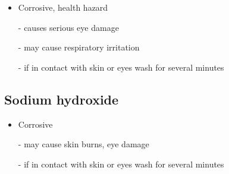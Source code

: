 \documentclass[a4paper, british]{article}
\begin{document}
\begin{appendices}
\begin{itemize}
    \item Corrosive, health hazard
    \item[-] causes serious eye damage
    \item[-] may cause respiratory irritation
    \item[-] if in contact with skin or eyes wash for several minutes  
\end{itemize}

\subsection*{Sodium hydroxide}

\begin{itemize}
    \item Corrosive
    \item[-] may cause skin burns, eye damage
    \item[-] if in contact with skin or eyes wash for several minutes  
\end{itemize}

\end{appendices}
\end{document}
